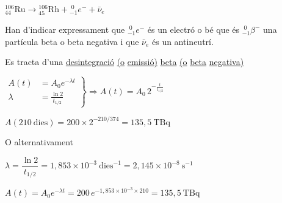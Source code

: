\begin{solapartat}
 ${}^{106}_{44}\mathrm{Ru} \rightarrow {}^{106}_{45}\mathrm{Rh} + {}^{\;0}_{-1}e^{-} + \bar{\nu}_e$

\medskip
{} Han d'indicar expressament que ${}^{\;0}_{-1}e^{-}$ és un electró o bé que és ${}^{\;0}_{-1}\beta^{-}$ una partícula beta o beta negativa i que $\bar{\nu}_e$ és un antineutrí.

Es tracta d'una \underline{desintegració} \underline{(o} \underline{emissió)} \underline{beta} \underline{(o} \underline{beta} \underline{negativa)}
\end{solapartat}

\begin{solapartat}
$\left.\begin{aligned} A(t) &= A_0 e^{-\lambda t}\\ \lambda &= \frac{\ln 2}{t_{1/2}} \end{aligned}\right\}
\Longrightarrow A(t) = A_0\, 2^{-\frac{t}{t_{1/2}}}$ \quad {}

 $A(210\ \text{dies}) = 200\times 2^{-210/374} = 135,5\ \mathrm{TBq}$

\medskip
O alternativament

 $\lambda = \dfrac{\ln 2}{t_{1/2}} = 1,853\times 10^{-3}\ \text{dies}^{-1} = 2,145\times 10^{-8}\ \mathrm{s^{-1}}$

 $A(t) = A_0 e^{-\lambda t} = 200\,e^{-1,853\times 10^{-3}\times 210} = 135,5\ \mathrm{TBq}$
\end{solapartat}
